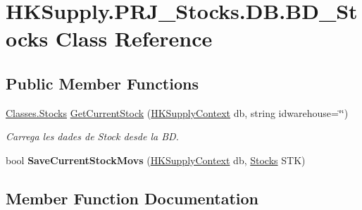 \hypertarget{class_h_k_supply_1_1_p_r_j___stocks_1_1_d_b_1_1_b_d___stocks}{}\section{H\+K\+Supply.\+P\+R\+J\+\_\+\+Stocks.\+D\+B.\+B\+D\+\_\+\+Stocks Class Reference}
\label{class_h_k_supply_1_1_p_r_j___stocks_1_1_d_b_1_1_b_d___stocks}
\subsection*{Public Member Functions}
\begin{DoxyCompactItemize}
\item 
\mbox{\hyperlink{class_h_k_supply_1_1_p_r_j___stocks_1_1_classes_1_1_stocks}{Classes.\+Stocks}} \mbox{\hyperlink{class_h_k_supply_1_1_p_r_j___stocks_1_1_d_b_1_1_b_d___stocks_a918727d0820627dd4a4f6facf54eb7da}{Get\+Current\+Stock}} (\mbox{\hyperlink{class_h_k_supply_1_1_d_b_1_1_h_k_supply_context}{H\+K\+Supply\+Context}} db, string idwarehouse=\char`\"{}\char`\"{})
\begin{DoxyCompactList}\small\item\em Carrega les dades de Stock desde la BD. \end{DoxyCompactList}\item 
\mbox{\label{class_h_k_supply_1_1_p_r_j___stocks_1_1_d_b_1_1_b_d___stocks_aad524df723c1bbed8fbf2343492b9489}} 
bool {\bfseries Save\+Current\+Stock\+Movs} (\mbox{\hyperlink{class_h_k_supply_1_1_d_b_1_1_h_k_supply_context}{H\+K\+Supply\+Context}} db, \mbox{\hyperlink{class_h_k_supply_1_1_p_r_j___stocks_1_1_classes_1_1_stocks}{Stocks}} S\+TK)
\end{DoxyCompactItemize}


\subsection{Member Function Documentation}
\mbox{\label{class_h_k_supply_1_1_p_r_j___stocks_1_1_d_b_1_1_b_d___stocks_a918727d0820627dd4a4f6facf54eb7da}} 
